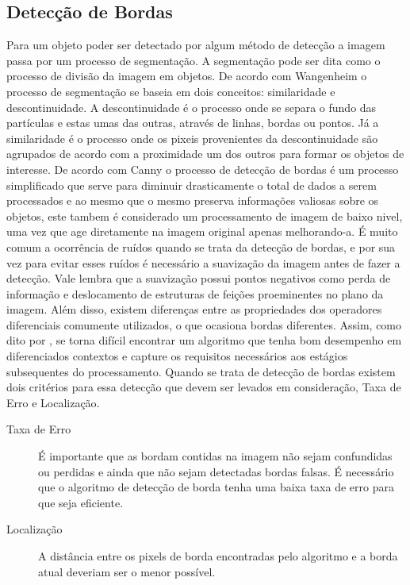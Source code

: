 \subsection{Detecção de Bordas}
Para um objeto poder ser detectado por algum método de detecção a imagem passa por um processo de segmentação. A segmentação pode ser dita como o processo de divisão da imagem em objetos\cite{Gonzalez:2008}. De acordo com Wangenheim\cite{Wangenheim:2014} o processo de segmentação se baseia em dois conceitos: similaridade e descontinuidade. A descontinuidade é o processo onde se separa o fundo das partículas e estas umas das outras, através de linhas, bordas ou pontos. Já a similaridade é o processo onde os pixeis provenientes da descontinuidade são agrupados de acordo com a proximidade um dos outros para formar os objetos de interesse. De acordo com Canny\cite{Canny:1986} o processo de detecção de bordas é um processo simplificado que serve para diminuir drasticamente o total de dados a serem processados e ao mesmo que o mesmo preserva informações valiosas sobre os objetos, este tambem é considerado um processamento de imagem de baixo nivel, uma vez que age diretamente na imagem original apenas melhorando-a. É muito comum a ocorrência de ruídos quando se trata da detecção de bordas, e por sua vez para evitar esses ruídos é necessário a suavização da imagem antes de fazer a detecção. Vale\cite{Vale:2002} lembra que a suavização possui pontos negativos como perda de informação e deslocamento de estruturas de feições proeminentes no plano da imagem. Além disso, existem diferenças entre as propriedades dos operadores diferenciais comumente utilizados, o que ocasiona  bordas diferentes. Assim, como dito por , se torna difícil encontrar um algoritmo que tenha bom desempenho em diferenciados contextos e capture os requisitos necessários aos estágios subsequentes do processamento. 
Quando se trata de detecção de bordas existem dois critérios\cite{Canny:1986} para essa detecção que devem ser levados em consideração, Taxa de Erro e Localização\cite{Vale:2002}. 
\begin{description}
	\item[Taxa de Erro] É importante que as bordam contidas na imagem não sejam confundidas ou perdidas e ainda que não sejam detectadas bordas falsas. É necessário que o algoritmo de detecção de borda tenha uma baixa taxa de erro para que seja eficiente\cite{Wangenheim:2014, Canny:1986, Vale:2002}.
	\item[Localização] A distância entre os pixels de borda encontradas pelo algoritmo e a borda atual deveriam ser o menor possível\cite{Wangenheim:2014}.
\end{description}
